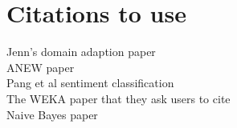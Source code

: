 \documentclass[letterpaper]{article}
\begin{document}
\section{Citations to use}
Jenn's domain adaption paper \cite{JennLearnDiffDomains}\\
ANEW paper \cite{DoddsANEWPaper}\\
Pang et al sentiment classification \cite{PangSentimentClassification}\\
The WEKA paper that they ask users to cite \cite{weka} \\
Naive Bayes paper \cite{naivebayes}


\end{document}
